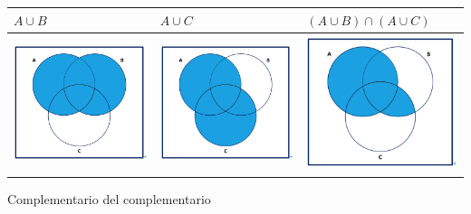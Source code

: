 \documentclass[
  letterpaper,
  DIV=11,
  numbers=noendperiod]{scrreprt}
\begin{document}
\begin{longtable}[]{@{}
  >{\centering\arraybackslash}p{}
  >{\centering\arraybackslash}p{}
  >{\centering\arraybackslash}p{}@{}}
\toprule\noalign{}
\begin{minipage}[b]{\linewidth}\centering
\(A\cup B\)
\end{minipage} & \begin{minipage}[b]{\linewidth}\centering
\(A\cup C\)
\end{minipage} & \begin{minipage}[b]{\linewidth}\centering
\((A\cup B)\cap (A\cup C)\)
\end{minipage} \\
\midrule\noalign{}
\endhead
\bottomrule\noalign{}
\endlastfoot
\includegraphics[width=\linewidth,height=1.5625in,keepaspectratio]{Images/venn1AoB.jpeg}
&
\includegraphics[width=\linewidth,height=1.5625in,keepaspectratio]{Images/venn1AoC.jpeg}
&
\includegraphics[width=\linewidth,height=1.5625in,keepaspectratio]{Images/venn1AUByC.jpeg} \\
\end{longtable}

Complementario del complementario
\end{document}
